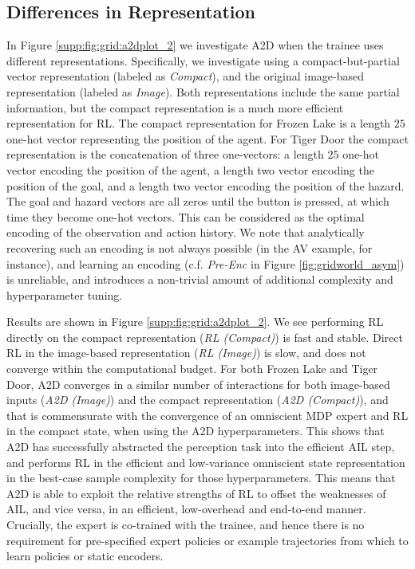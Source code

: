 \subsection{Differences in Representation}
In Figure \ref{supp:fig:grid:a2dplot_2} we investigate A2D when the trainee uses different representations.  Specifically, we investigate using a compact-but-partial vector representation (labeled as \emph{Compact}), and the original image-based representation (labeled as \emph{Image}).  Both representations include the same partial information, but the compact representation is a much more efficient representation for RL.  The compact representation for Frozen Lake is a length $25$ one-hot vector representing the position of the agent.  For Tiger Door the compact representation is the concatenation of three one-vectors: a length $25$ one-hot vector encoding the position of the agent, a length two vector encoding the position of the goal, and a length two vector encoding the position of the hazard.  The goal and hazard vectors are all zeros until the button is pressed, at which time they become one-hot vectors.  This can be considered as the optimal encoding of the observation and action history.  We note that analytically recovering such an encoding is not always possible (in the AV example, for instance), and learning an encoding (c.f. \emph{Pre-Enc} in Figure \ref{fig:gridworld_asym}) is unreliable, and introduces a non-trivial amount of additional complexity and hyperparameter tuning.  

Results are shown in Figure \ref{supp:fig:grid:a2dplot_2}.  We see performing RL directly on the compact representation (\emph{RL (Compact)}) is fast and stable.  Direct RL in the image-based representation (\emph{RL (Image)}) is slow, and does not converge within the computational budget.  For both Frozen Lake and Tiger Door, A2D converges in a similar number of interactions for both image-based inputs (\emph{A2D (Image)}) and the compact representation (\emph{A2D (Compact)}), and that is commensurate with the convergence of an omniscient MDP expert and RL in the compact state, when using the A2D hyperparameters.  This shows that A2D has successfully abstracted the perception task into the efficient AIL step, and performs RL in the efficient and low-variance omniscient state representation in the best-case sample complexity for those hyperparameters.  This means that A2D is able to exploit the relative strengths of RL to offset the weaknesses of AIL, and vice versa, in an efficient, low-overhead and end-to-end manner.  Crucially, the expert is co-trained with the trainee, and hence there is no requirement for pre-specified expert policies or example trajectories from which to learn policies or static encoders.  


\newpage

